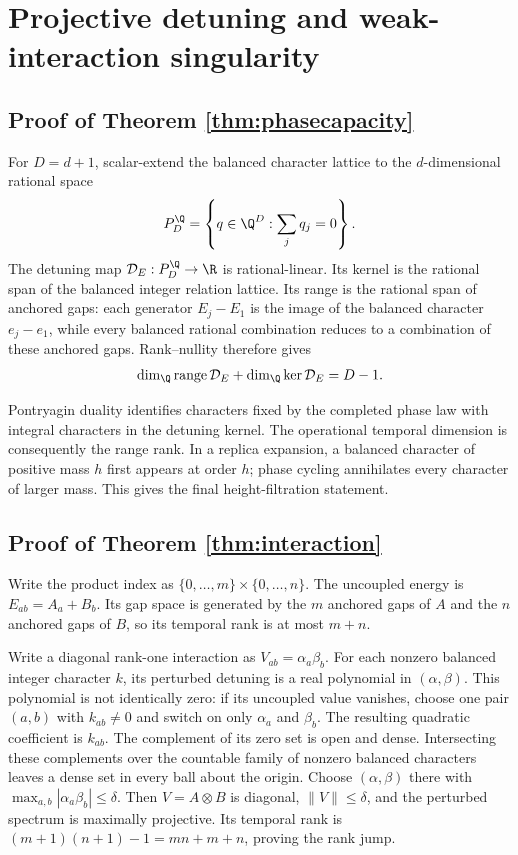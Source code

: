 \section{Projective detuning and weak-interaction singularity}

\subsection{Proof of Theorem \ref{thm:phasecapacity}}

For $D=d+1$, scalar-extend the balanced character lattice to the
$d$-dimensional rational space
\[
 P_D^{\Q}=\left\{q\in\Q^D:\sum_jq_j=0\right\}.
\]
The detuning map $\mathcal D_E:P_D^{\Q}\to\R$ is rational-linear.  Its
kernel is the rational span of the balanced integer relation lattice.  Its
range is the rational span of anchored gaps: each generator $E_j-E_1$ is the
image of the balanced character $e_j-e_1$, while every balanced rational
combination reduces to a combination of these anchored gaps.  Rank--nullity
therefore gives
\[
 \dim_{\Q}\operatorname{range}\mathcal D_E+
 \dim_{\Q}\ker\mathcal D_E=D-1.
\]

Pontryagin duality identifies characters fixed by the completed phase law
with integral characters in the detuning kernel.  The operational temporal
dimension is consequently the range rank.  In a replica expansion, a
balanced character of positive mass $h$ first appears at order $h$; phase
cycling annihilates every character of larger mass.  This gives the final
height-filtration statement.

\subsection{Proof of Theorem \ref{thm:interaction}}

Write the product index as
$\{0,\ldots,m\}\times\{0,\ldots,n\}$.  The uncoupled energy is
$E_{ab}=A_a+B_b$.  Its gap space is generated by the $m$ anchored gaps of
$A$ and the $n$ anchored gaps of $B$, so its temporal rank is at most $m+n$.

Write a diagonal rank-one interaction as
$V_{ab}=\alpha_a\beta_b$.  For each nonzero balanced integer character $k$,
its perturbed detuning is a real polynomial in $(\alpha,\beta)$.  This
polynomial is not identically zero: if its uncoupled value vanishes, choose
one pair $(a,b)$ with $k_{ab}\ne0$ and switch on only $\alpha_a$ and
$\beta_b$.  The resulting quadratic coefficient is $k_{ab}$.  The complement
of its zero set is open and dense.  Intersecting these complements over the
countable family of nonzero balanced characters leaves a dense set in every
ball about the origin.  Choose $(\alpha,\beta)$ there with
$\max_{a,b}|\alpha_a\beta_b|\le\delta$.  Then $V=A\otimes B$ is diagonal,
$\|V\|\le\delta$, and the perturbed spectrum is maximally projective.  Its
temporal rank is $(m+1)(n+1)-1=mn+m+n$, proving the rank jump.

